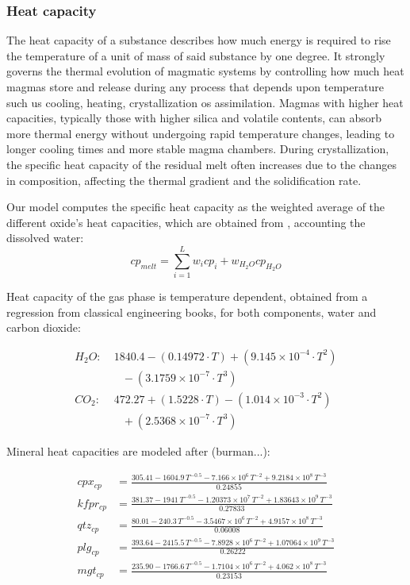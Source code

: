 \subsubsection{Heat capacity}
The heat capacity of a substance describes how much energy is required to rise the temperature of a unit of mass of said substance by one degree. It strongly governs the thermal evolution of magmatic systems by controlling how much heat magmas store and release during any process that depends upon temperature such us cooling, heating, crystallization os assimilation. Magmas with higher heat capacities, typically those with higher silica and volatile contents, can absorb more thermal energy without undergoing rapid temperature changes, leading to longer cooling times and more stable magma chambers. During crystallization, the specific heat capacity of the residual melt often increases due to the changes in composition, affecting the thermal gradient and the solidification rate.

Our model computes the specific heat capacity as the weighted average of the different oxide's heat capacities, which are obtained from \cite{lesher2015}, accounting the dissolved water:
\begin{equation}    
	cp_{melt} = \sum_{i=1}^L w_i cp_i + w_{H_2O} cp_{H_2O}
\end{equation}

Heat capacity of the gas phase is temperature dependent, obtained from a regression from classical engineering books, for both components, water and carbon dioxide:

\begin{equation}
	\begin{split}
		H_2O: &\; 1840.4 - (0.14972 \cdot T) + (9.145 \times 10^{-4} \cdot T^2) \\
		&\quad - (3.1759 \times 10^{-7} \cdot T^3) \\
		CO_2: &\; 472.27 + (1.5228 \cdot T) - (1.014 \times 10^{-3} \cdot T^2) \\
		&\quad + (2.5368 \times 10^{-7} \cdot T^3)
	\end{split}
\end{equation}

Mineral heat capacities are modeled after (burman...):

\begin{equation}
	\begin{aligned}
		cpx_{cp} &= \frac{305.41 - 1604.9\, T^{-0.5} - 7.166 \times 10^6\, T^{-2} + 9.2184 \times 10^8\, T^{-3}}{0.24855} \\[2ex]
		kfpr_{cp} &= \frac{381.37 - 1941\, T^{-0.5} - 1.20373 \times 10^7\, T^{-2} + 1.83643 \times 10^9\, T^{-3}}{0.27833} \\[2ex]
		qtz_{cp} &= \frac{80.01 - 240.3\, T^{-0.5} - 3.5467 \times 10^6\, T^{-2} + 4.9157 \times 10^8\, T^{-3}}{0.06008} \\[2ex]
		plg_{cp} &= \frac{393.64 - 2415.5\, T^{-0.5} - 7.8928 \times 10^6\, T^{-2} + 1.07064 \times 10^9\, T^{-3}}{0.26222} \\[2ex]
		mgt_{cp} &= \frac{235.90 - 1766.6\, T^{-0.5} - 1.7104 \times 10^6\, T^{-2} + 4.062 \times 10^8\, T^{-3}}{0.23153}
	\end{aligned}
\end{equation}

